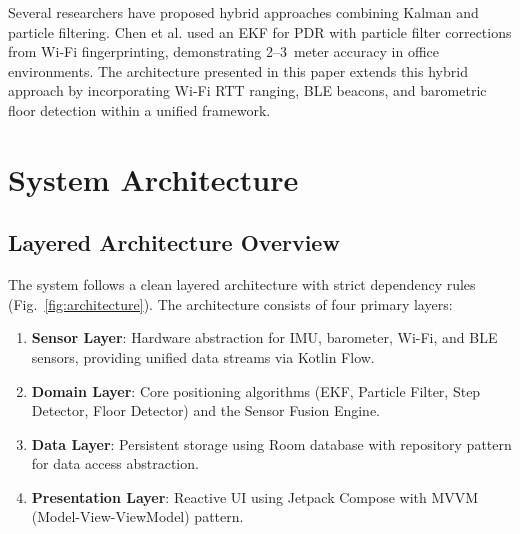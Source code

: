 \documentclass[journal,twocolumn]{IEEEtran}
\begin{document}
Several researchers have proposed hybrid approaches combining Kalman and particle filtering. Chen et al. \cite{chen2015fusion} used an EKF for PDR with particle filter corrections from Wi-Fi fingerprinting, demonstrating 2--3~meter accuracy in office environments. The architecture presented in this paper extends this hybrid approach by incorporating Wi-Fi RTT ranging, BLE beacons, and barometric floor detection within a unified framework.

\section{System Architecture}
\label{sec:architecture}

\subsection{Layered Architecture Overview}

The system follows a clean layered architecture with strict dependency rules (Fig.~\ref{fig:architecture}). The architecture consists of four primary layers:

\begin{enumerate}
    \item \textbf{Sensor Layer}: Hardware abstraction for IMU, barometer, Wi-Fi, and BLE sensors, providing unified data streams via Kotlin Flow.
    \item \textbf{Domain Layer}: Core positioning algorithms (EKF, Particle Filter, Step Detector, Floor Detector) and the Sensor Fusion Engine.
    \item \textbf{Data Layer}: Persistent storage using Room database with repository pattern for data access abstraction.
    \item \textbf{Presentation Layer}: Reactive UI using Jetpack Compose with MVVM (Model-View-ViewModel) pattern.
\end{enumerate}
\end{document}

